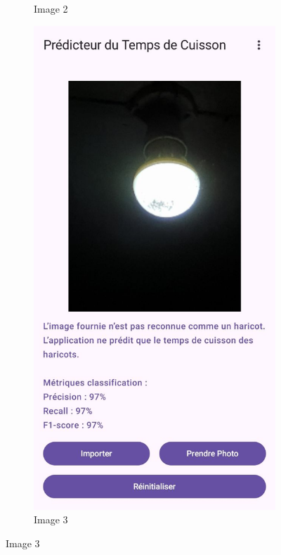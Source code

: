 \begin{figure}[H]
\begin{subfigure}{0.2\textwidth}
        \caption{Image 2}
    \end{subfigure}\hfill
    \begin{subfigure}{0.2\textwidth}
        \centering
        \includegraphics[width=\linewidth]{figures/test3.jpg}
        \caption{Image 3}
    \end{subfigure}


\end{figure}
